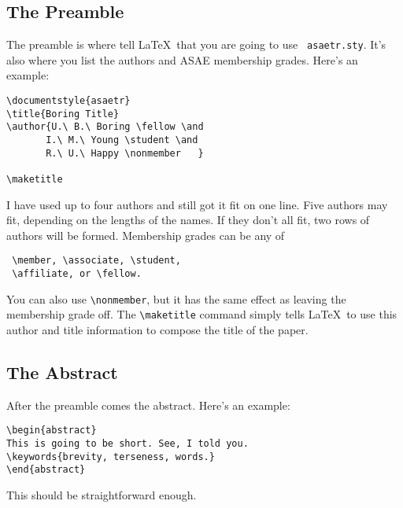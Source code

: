 \subsection{The Preamble}
The preamble is where tell \LaTeX\ that you are going to use {\tt
asaetr.sty}.  It's also where you list the authors and ASAE membership
grades. Here's an example:
\small \begin{verbatim}
\documentstyle{asaetr}
\title{Boring Title}
\author{U.\ B.\ Boring \fellow \and 
       I.\ M.\ Young \student \and
       R.\ U.\ Happy \nonmember   }

\maketitle
\end{verbatim} \normalsize
I have used up to four authors and still got it fit on one line.  Five
authors may fit, depending on the lengths of the names. If they don't
all fit, two rows of authors will be formed. Membership grades can be
any of
\small \begin{verbatim}
 \member, \associate, \student, 
 \affiliate, or \fellow. 
\end{verbatim} \normalsize
\noindent
You can also use \verb#\nonmember#, but it has the same effect
as leaving the membership grade off. The \verb#\maketitle# command
simply tells \LaTeX\ to use this author and title information to
compose the title of the paper.

\subsection{The Abstract}

After the preamble comes the abstract. Here's an example:
\small\begin{verbatim}
\begin{abstract}
This is going to be short. See, I told you.
\keywords{brevity, terseness, words.}
\end{abstract}
\end{verbatim}\normalsize
This should be straightforward enough.

